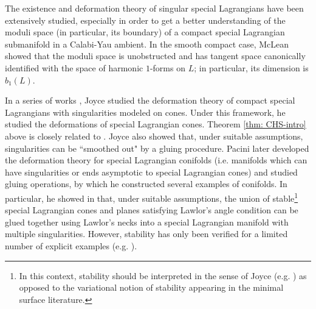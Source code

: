 \documentclass[11pt]{amsart}
\theoremstyle{definition}
\theoremstyle{remark}
\begin{document}
The existence and deformation theory of singular special Lagrangians have been extensively studied, especially in order to get a better understanding of the moduli space (in particular, its boundary) of a compact special Lagrangian submanifold in a Calabi-Yau ambient. In the smooth compact case, McLean \cite{McLean} showed that the moduli space is unobstructed and has tangent space canonically identified with the space of harmonic $1$-forms on $L$; in particular, its dimension is $b_1(L)$.

In a series of works \cite{joyce-1, joyce-2, Joyce-CS-III, Joyce-CS-IV,Joyce-CS-V}, Joyce studied the deformation theory of compact special Lagrangians with singularities modeled on cones. Under this framework, he studied the deformations of special Lagrangian cones. Theorem \ref{thm: CHS-intro} above is closely related to \cite[Section 6]{joyce-2}.
Joyce also showed that, under suitable assumptions, singularities can be ``smoothed out" by a gluing procedure. Pacini \cite{Pacini-moduli-spaces, Pacini-gluing, Pacini-Uniform} later developed the deformation theory for special Lagrangian conifolds (i.e. manifolds which can have singularities or ends asymptotic to special Lagrangian cones) and studied gluing operations, by which he constructed several examples of conifolds. In particular, he showed in \cite[Theorem 6.10, Example 6.12]{Pacini-gluing} that, under suitable assumptions, the union of stable\footnote{In this context, stability should be interpreted in the sense of Joyce (e.g. \cite[Definition 3.6]{Joyce-CS-V}) as opposed to the variational notion of stability appearing in the minimal surface literature.} special Lagrangian cones and planes satisfying Lawlor's angle condition can be glued together using Lawlor's necks into a special Lagrangian manifold with multiple singularities. However, stability has only been verified for a limited number of explicit examples (e.g.  \cite{Joyce-CS-V, Ha04, Oh07}). 
\end{document}
